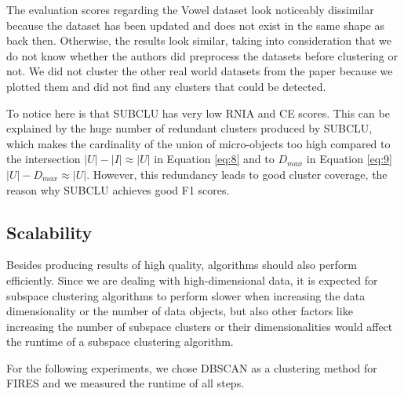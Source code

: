 The evaluation scores regarding the Vowel dataset look noticeably dissimilar because the dataset has been updated and does not exist in the same shape as back then. Otherwise, the results look similar, taking into consideration that we do not know whether the authors did preprocess the datasets before clustering or not. We did not cluster the other real world datasets from the paper because we plotted them and did not find any clusters that could be detected.

To notice here is that SUBCLU has very low RNIA and CE scores. This can be explained by the huge number of redundant clusters produced by SUBCLU, which makes the cardinality of the union of micro-objects too high compared to the intersection  $|U| - |I| \approx |U|$ in Equation \ref{eq:8} and to $D_{max}$ in Equation \ref{eq:9} $|U| - D_{max} \approx |U|$. However, this redundancy leads to good cluster coverage, the reason why SUBCLU achieves good F1 scores. 

\subsection{Scalability}
Besides producing results of high quality, algorithms should also perform efficiently. Since we are dealing with high-dimensional data, it is expected for subspace clustering algorithms to perform slower when increasing the data dimensionality or the number of data objects, but also other factors like increasing the number of subspace clusters or their dimensionalities would affect the runtime of a subspace clustering algorithm.

For the following experiments, we chose DBSCAN as a clustering method for FIRES and we measured the runtime of all steps. 


